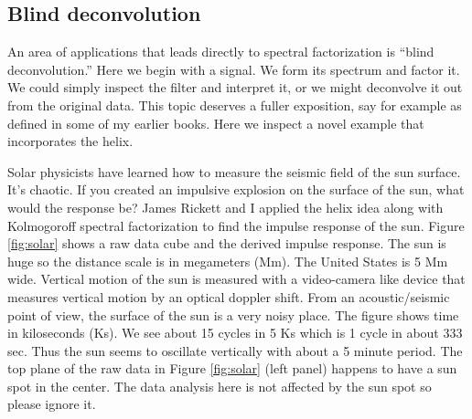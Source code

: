 \subsection{Blind deconvolution}
An area of applications that leads directly to spectral factorization
is ``blind deconvolution.''
Here we begin with a signal.
We form its spectrum and factor it.
We could simply inspect the filter and interpret it,
or we might deconvolve it out from the original data.
This topic deserves a fuller exposition, say for example
as defined in some of my earlier books.
Here we inspect a novel example that incorporates the helix.


\par
Solar physicists have learned how to measure
the seismic field of the sun surface. It's chaotic.
If you created an impulsive explosion on the surface of the sun,
what would the response be?
James Rickett and I applied the helix idea along with Kolmogoroff
spectral factorization to find the impulse response of the sun.
Figure \ref{fig:solar} shows a raw data cube and the derived impulse response.
The sun is huge so the distance scale is in megameters (Mm).
The United States is 5 Mm wide.
Vertical motion of the sun is measured with a video-camera like device
that measures vertical motion by an optical doppler shift.
From an acoustic/seismic point of view,
the surface of the sun is a very noisy place.
The figure shows time in kiloseconds (Ks).
We see about 15 cycles in 5 Ks which is 1 cycle in about 333 sec.
Thus the sun seems to oscillate vertically with about a 5 minute period.
The top plane of the raw data
in Figure \ref{fig:solar} (left panel)
happens to have a sun spot in the center.
The data analysis here is not affected by the sun spot so please ignore it.

